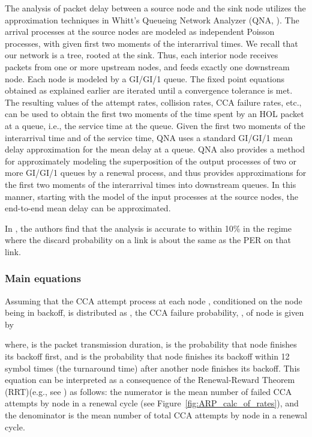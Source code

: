 \documentclass[12pt, draftclsnofoot, onecolumn]{IEEEtran}
\begin{document}
The analysis of packet delay between a source node and the sink node utilizes the approximation techniques in Whitt's Queueing Network Analyzer (QNA, \cite{whitt83queueing-network-analyzer}). The arrival processes at the source nodes are modeled as independent Poisson processes, with given first two moments of the interarrival times. We recall that our network is a tree, rooted at the sink. Thus, each interior node receives packets from one or more upstream nodes, and feeds exactly one downstream node. Each node is modeled by a GI/GI/1 queue. The fixed point equations obtained as explained earlier are iterated until a convergence tolerance is met. The resulting values of the attempt rates, collision rates, CCA failure rates, etc., can be used to obtain the first two moments of the time spent by an HOL packet at a queue, i.e., the service time at the queue. Given the first two moments of the interarrival time and of the service time, QNA uses a standard GI/GI/1 mean delay approximation for the mean delay at a queue. QNA also provides a method for approximately modeling the superposition of the output processes of two or more GI/GI/1 queues by a renewal process, and thus provides approximations for the first two moments of the interarrival times into downstream queues. In this manner, starting with the model of the input processes at the source nodes, the end-to-end mean delay can be approximated. 

In \cite{srivastava}, the authors find that the analysis is accurate to within 10\% in the regime where the discard probability on a link is about the same as the PER on that link.

\subsubsection{Main equations}

Assuming that the CCA attempt process at each node , conditioned on the node being in backoff, is distributed as , the CCA failure probability, , of node  is given by

where,  is the packet transmission duration,  is the probability that node  finishes its backoff first, and  is the probability that node  finishes its backoff within 12 symbol times (the turnaround time) after another node finishes its backoff. This equation can be interpreted as a consequence of the Renewal-Reward Theorem (RRT)(e.g., see \cite{ross07prob-models}) as follows: the numerator is the mean number of failed CCA attempts by node  in a renewal cycle (see Figure~\ref{fig:ARP_calc_of_rates}), and the denominator is the mean number of total CCA attempts by node  in a renewal cycle. 
\end{document}

